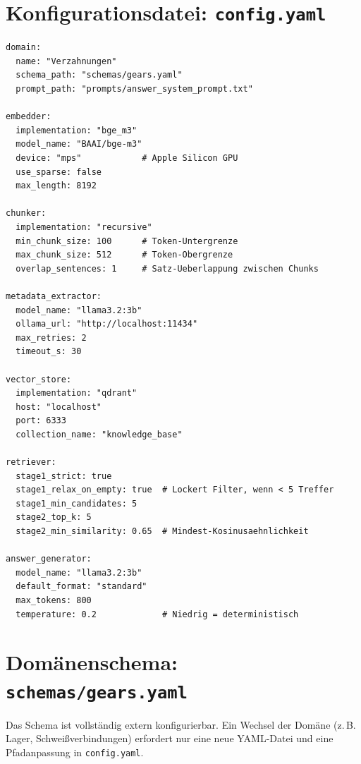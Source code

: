 \documentclass[12pt, a4paper]{article}
\begin{document}
\newpage
\section{Konfigurationsdatei: \texttt{config.yaml}}

\begin{lstlisting}[style=yamlstyle, caption={Aktuelle Konfiguration (config.yaml)}]
domain:
  name: "Verzahnungen"
  schema_path: "schemas/gears.yaml"
  prompt_path: "prompts/answer_system_prompt.txt"

embedder:
  implementation: "bge_m3"
  model_name: "BAAI/bge-m3"
  device: "mps"            # Apple Silicon GPU
  use_sparse: false
  max_length: 8192

chunker:
  implementation: "recursive"
  min_chunk_size: 100      # Token-Untergrenze
  max_chunk_size: 512      # Token-Obergrenze
  overlap_sentences: 1     # Satz-Ueberlappung zwischen Chunks

metadata_extractor:
  model_name: "llama3.2:3b"
  ollama_url: "http://localhost:11434"
  max_retries: 2
  timeout_s: 30

vector_store:
  implementation: "qdrant"
  host: "localhost"
  port: 6333
  collection_name: "knowledge_base"

retriever:
  stage1_strict: true
  stage1_relax_on_empty: true  # Lockert Filter, wenn < 5 Treffer
  stage1_min_candidates: 5
  stage2_top_k: 5
  stage2_min_similarity: 0.65  # Mindest-Kosinusaehnlichkeit

answer_generator:
  model_name: "llama3.2:3b"
  default_format: "standard"
  max_tokens: 800
  temperature: 0.2             # Niedrig = deterministisch
\end{lstlisting}

\section{Domänenschema: \texttt{schemas/gears.yaml}}

Das Schema ist vollständig extern konfigurierbar. Ein Wechsel der Domäne
(z.\,B. Lager, Schweißverbindungen) erfordert nur eine neue YAML-Datei
und eine Pfadanpassung in \texttt{config.yaml}.
\end{document}
